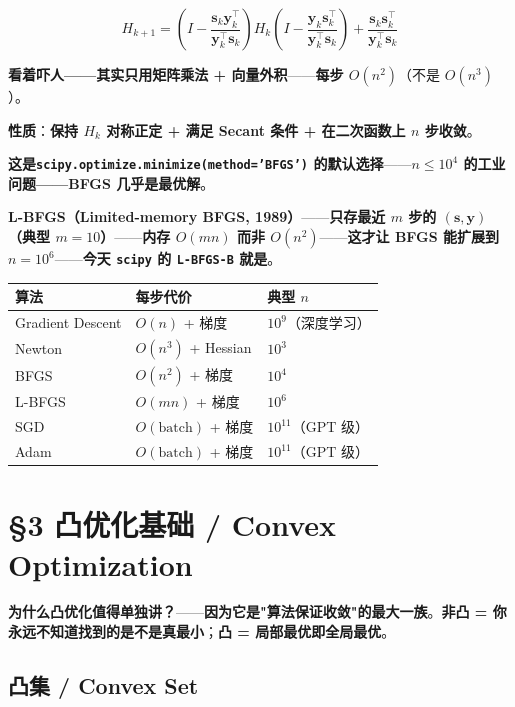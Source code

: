 \begin{equation}
H_{k+1} = \left(I - \frac{\bm s_k \bm y_k^\top}{\bm y_k^\top \bm s_k}\right) H_k \left(I - \frac{\bm y_k \bm s_k^\top}{\bm y_k^\top \bm s_k}\right) + \frac{\bm s_k \bm s_k^\top}{\bm y_k^\top \bm s_k}
\end{equation}

\textbf{看着吓人——其实只用矩阵乘法 + 向量外积}——\textbf{每步 $O(n^2)$}（不是 $O(n^3)$）。

\textbf{性质}：\textbf{保持 $H_k$ 对称正定 + 满足 Secant 条件 + 在二次函数上 $n$ 步收敛}。

\textbf{这是\texttt{scipy.optimize.minimize(method='BFGS')} 的默认选择}——\textbf{$n \le 10^4$ 的工业问题——BFGS 几乎是最优解}。

\textbf{L-BFGS（Limited-memory BFGS, 1989）}——\textbf{只存最近 $m$ 步的 $(\bm s, \bm y)$（典型 $m=10$）}——\textbf{内存 $O(mn)$ 而非 $O(n^2)$}——\textbf{这才让 BFGS 能扩展到 $n=10^6$}——\textbf{今天 \texttt{scipy} 的 \texttt{L-BFGS-B} 就是}。

\begin{tcolorbox}[essbox={无约束优化算法谱系}]
\begin{tabular}{lll}
\toprule
\textbf{算法} & \textbf{每步代价} & \textbf{典型 $n$} \\
\midrule
Gradient Descent & $O(n)$ + 梯度 & $10^9$（深度学习） \\
Newton & $O(n^3)$ + Hessian & $10^3$ \\
BFGS & $O(n^2)$ + 梯度 & $10^4$ \\
L-BFGS & $O(mn)$ + 梯度 & $10^6$ \\
SGD & $O(\text{batch})$ + 梯度 & $10^{11}$（GPT 级） \\
Adam & $O(\text{batch})$ + 梯度 & $10^{11}$（GPT 级） \\
\bottomrule
\end{tabular}
\end{tcolorbox}

\section{§3 凸优化基础 / Convex Optimization}

\textbf{为什么凸优化值得单独讲？}——\textbf{因为它是"\textbf{算法保证收敛}"的最大一族}。\textbf{非凸 = 你永远不知道找到的是不是真最小}；\textbf{凸 = \textbf{局部最优即全局最优}}。

\subsection{凸集 / Convex Set}

